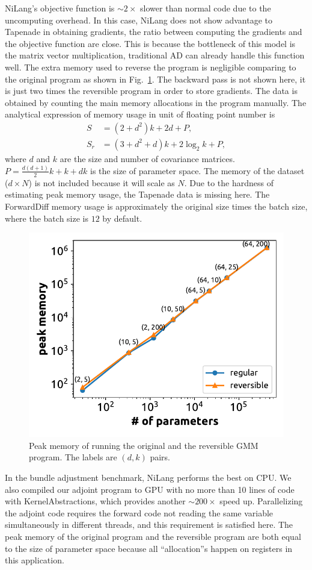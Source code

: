 \documentclass{article}
\newcommand{\<}{\langle}
\renewcommand{\>}{\rangle}
\newcommand{\Fig}[1]{Fig.~\ref{#1}}
\theoremstyle{definition}\newtheorem{definition}{\textit{Definition}}
\begin{document}
NiLang's objective function is $\sim 2\times$ slower than normal code due to the uncomputing overhead.
In this case, NiLang does not show advantage to Tapenade in obtaining gradients, the ratio between computing the gradients and the objective function are close.
This is because the bottleneck of this model is the matrix vector multiplication, traditional AD can already handle this function well.
The extra memory used to reverse the program is negligible comparing to the original program as shown in \Fig{fig:gmm-memory}.
The backward pass is not shown here, it is just two times the reversible program in order to store gradients. 
The data is obtained by counting the main memory allocations in the program manually. The analytical expression of memory usage in unit of floating point number is
\begin{align}
    S &= (2+d^2)k+2d + P, \\
    S_r &= (3+d^2+d)k+2{\log}_2k + P,
\end{align}
where $d$ and $k$ are the size and number of covariance matrices. $P = \frac{d(d+1)}{2}k + k + dk$ is the size of parameter space. The memory of the dataset ($d\times N$) is not included because it will scale as $N$.
Due to the hardness of estimating peak memory usage, the Tapenade data is missing here. The ForwardDiff memory usage is approximately the original size times the batch size, where the batch size is $12$ by default.
\begin{figure}
    \centerline{\includegraphics[width=0.55\columnwidth,trim={0 0cm 0 0},clip]{fig10.pdf}}
    \caption{Peak memory of running the original and the reversible GMM program. The labels are $(d, k)$ pairs.}\label{fig:gmm-memory}
\end{figure}

In the bundle adjustment benchmark, NiLang performs the best on CPU.
We also compiled our adjoint program to GPU with no more than 10 lines of code with KernelAbstractions, which provides another $\sim 200\times$ speed up.
Parallelizing the adjoint code requires the forward code not reading the same variable simultaneously in different threads, and this requirement is satisfied here.
The peak memory of the original program and the reversible program are both equal to the size of parameter space because all ``allocation''s happen on registers in this application.
\end{document}
